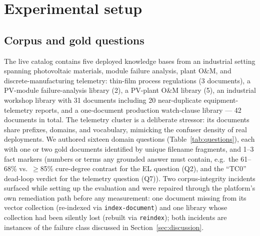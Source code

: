 \section{Experimental setup}
\label{sec:setup}

\subsection{Corpus and gold questions}
The live catalog contains five deployed knowledge bases from an industrial
setting spanning photovoltaic materials, module failure analysis, plant
O\&M, and discrete-manufacturing telemetry: thin-film process regulations
(3 documents), a
PV-module failure-analysis library (2), a PV-plant O\&M library (5), an
industrial workshop library with 31 documents including 20 near-duplicate
equipment-telemetry reports, and a one-document production watch-clause
library --- 42 documents in total. The telemetry cluster is a deliberate
stressor: its documents share prefixes, domains, and vocabulary, mimicking
the confuser density of real deployments. We authored sixteen domain
questions (Table~\ref{tab:questions}), each with one or two gold documents
identified by unique filename fragments, and 1--3 fact markers (numbers or
terms any grounded answer must contain, e.g.\ the 61--68\% vs.\ $\geq$85\%
cure-degree contrast for the EL question (Q2), and the ``TC0'' dead-loop
verdict for the telemetry question (Q7)).
Two corpus-integrity incidents surfaced while setting up the evaluation and
were repaired through the platform's own remediation path before any
measurement: one document missing from its vector collection (re-indexed
via \texttt{index-document}) and one library whose collection had been
silently lost (rebuilt via \texttt{reindex}); both incidents are instances
of the failure class discussed in Section~\ref{sec:discussion}.

